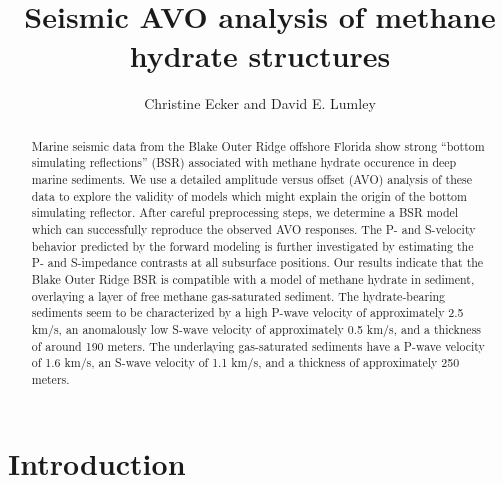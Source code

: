 
\def\deg{^{^{\circ}}}

\title{Seismic AVO analysis of methane hydrate structures}
\author{Christine Ecker and David E. Lumley}
\maketitle

\begin{abstract}
Marine seismic data from the Blake Outer Ridge offshore Florida show strong
``bottom simulating reflections'' (BSR) associated with methane hydrate
occurence in deep marine sediments. We use a detailed amplitude versus 
offset (AVO) analysis of these data to explore the validity of models which
might explain the origin of the bottom simulating reflector. After careful
preprocessing steps, we determine a BSR model which can successfully reproduce
the observed AVO responses. The P- and S-velocity behavior predicted by the 
forward modeling is further investigated by estimating the P- and S-impedance
contrasts at all subsurface positions. Our results indicate that the Blake Outer
Ridge BSR is compatible with a model of methane hydrate in sediment, overlaying 
a layer of free methane gas-saturated sediment. The hydrate-bearing
sediments seem to be characterized by a high P-wave velocity of
approximately 2.5 km/s, an anomalously low S-wave velocity of
approximately 0.5 km/s, and a thickness of around 190 meters.
The underlaying gas-saturated sediments have a P-wave velocity of 1.6 km/s, an
S-wave velocity of 1.1 km/s, and a thickness of approximately 250 meters.
\end{abstract}


\section{Introduction}

